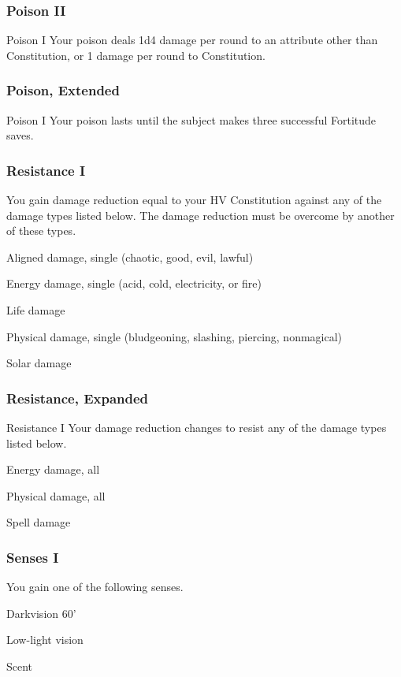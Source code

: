 \subsubsection{Poison II}
\featpre Poison I
\featben Your poison deals 1d4 damage per round to an attribute other than Constitution, or 1 damage per round to Constitution.

\subsubsection{Poison, Extended}
\featpre Poison I
\featben Your poison lasts until the subject makes three successful Fortitude saves.

\subsubsection{Resistance I}
\featben You gain damage reduction equal to your HV \add Constitution against any of the damage types listed below. The damage reduction must be overcome by another of these types.
\begin{itemize*}
    \item Aligned damage, single (chaotic, good, evil, lawful)
    \item Energy damage, single (acid, cold, electricity, or fire)
    \item Life damage
    \item Physical damage, single (bludgeoning, slashing, piercing, nonmagical)
    \item Solar damage
\end{itemize*}

\subsubsection{Resistance, Expanded}
\featpre Resistance I
\featben Your damage reduction changes to resist any of the damage types listed below.
\begin{itemize*}
    \item Energy damage, all
    \item Physical damage, all
    \item Spell damage
\end{itemize*}

\subsubsection{Senses I}
\featben You gain one of the following senses.
\begin{itemize*}
    \item Darkvision 60'
    \item Low-light vision
    \item Scent
\end{itemize*}

